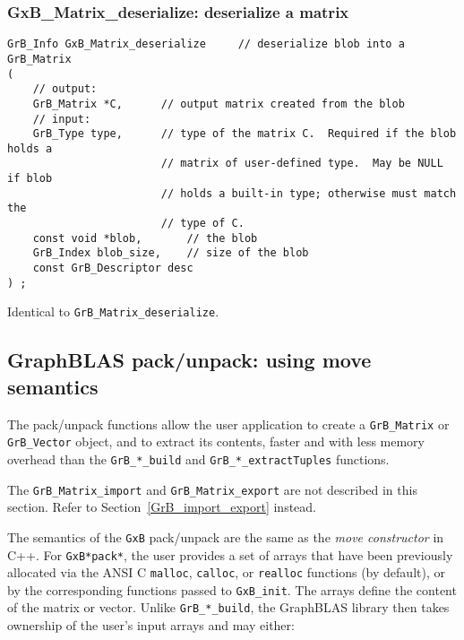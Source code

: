 \documentclass[12pt]{article}
\begin{document}
\subsubsection{{\sf GxB\_Matrix\_deserialize:}    deserialize a matrix}
\label{matrix_deserialize_GxB}

\begin{mdframed}[userdefinedwidth=6in]
{\footnotesize
\begin{verbatim}
GrB_Info GxB_Matrix_deserialize     // deserialize blob into a GrB_Matrix
(
    // output:
    GrB_Matrix *C,      // output matrix created from the blob
    // input:
    GrB_Type type,      // type of the matrix C.  Required if the blob holds a
                        // matrix of user-defined type.  May be NULL if blob
                        // holds a built-in type; otherwise must match the
                        // type of C.
    const void *blob,       // the blob
    GrB_Index blob_size,    // size of the blob
    const GrB_Descriptor desc
) ;
\end{verbatim}
} \end{mdframed}

Identical to \verb'GrB_Matrix_deserialize'.

\newpage
\subsection{GraphBLAS pack/unpack: using move semantics} %
\label{pack_unpack}

The pack/unpack functions allow the user application to create a
\verb'GrB_Matrix' or \verb'GrB_Vector' object, and to extract its contents,
faster and with less memory overhead than the \verb'GrB_*_build' and
\verb'GrB_*_extractTuples' functions.

The \verb'GrB_Matrix_import' and \verb'GrB_Matrix_export' are not
described in this section.  Refer to Section~\ref{GrB_import_export} instead.

The semantics of the \verb'GxB' pack/unpack are the same as the
{\em move constructor} in C++.  For \verb'GxB*pack*', the user provides a set of
arrays that have been previously allocated via the ANSI C \verb'malloc',
\verb'calloc', or \verb'realloc' functions (by default), or by the
corresponding functions passed to \verb'GxB_init'.  The arrays define the
content of the matrix or vector.  Unlike \verb'GrB_*_build', the GraphBLAS
library then takes ownership of the user's input arrays and may either:
\end{document}
